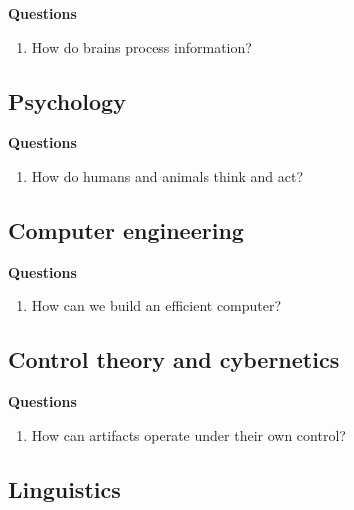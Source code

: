 \textbf{Questions}
\begin{enumerate}
    \item How do brains process information?
    \hfill \cite{ai/book/Artificial-Intelligence-A-Modern-Approach/Russell-Norvig}

\end{enumerate}



\subsection{Psychology}

\textbf{Questions}
\begin{enumerate}
    \item How do humans and animals think and act?
    \hfill \cite{ai/book/Artificial-Intelligence-A-Modern-Approach/Russell-Norvig}

\end{enumerate}




\subsection{Computer engineering}

\textbf{Questions}
\begin{enumerate}
    \item How can we build an efficient computer?
    \hfill \cite{ai/book/Artificial-Intelligence-A-Modern-Approach/Russell-Norvig}

\end{enumerate}




\subsection{Control theory and cybernetics}

\textbf{Questions}
\begin{enumerate}
    \item How can artifacts operate under their own control?
    \hfill \cite{ai/book/Artificial-Intelligence-A-Modern-Approach/Russell-Norvig}

\end{enumerate}




\subsection{Linguistics}

